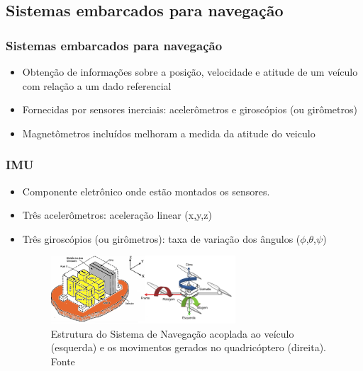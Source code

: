 \documentclass{beamer}
\begin{document}
\subsection*{Sistemas embarcados para navegação}
\begin{frame}
	
	\frametitle{Sistemas embarcados para navegação}
	
	\begin{itemize}

	\item Obtenção de informações sobre a posição, velocidade e atitude de um veículo com relação a um dado referencial	
	
	\item Fornecidas por sensores inerciais: acelerômetros e giroscópios (ou girômetros)
	
	\item Magnetômetros incluídos melhoram a medida da atitude do veiculo	
	
	\end{itemize}
	
\end{frame}	
\begin{frame}
	\frametitle{IMU}
	
	\begin{itemize}
		
		\item Componente eletrônico onde estão montados os sensores. 
		
		\item Três acelerômetros: aceleração linear (x,y,z)
		
		\item Três giroscópios (ou girômetros): taxa de variação dos ângulos ($\phi$,$\theta$,$\psi$)
	
	    \vspace{0.5cm}
	
		\begin{figure}[h]
			\centering
			\includegraphics[keepaspectratio = true,
			width=0.65\textwidth]{img/imuStrap.png}
			\caption{Estrutura do Sistema de Navegação acoplada ao veículo (esquerda) e os movimentos gerados no quadricóptero (direita). Fonte \cite{Adalberto2009}}
			\label{fig:imuStrap}
		\end{figure}
	\end{itemize}
\end{frame}
\end{document}
